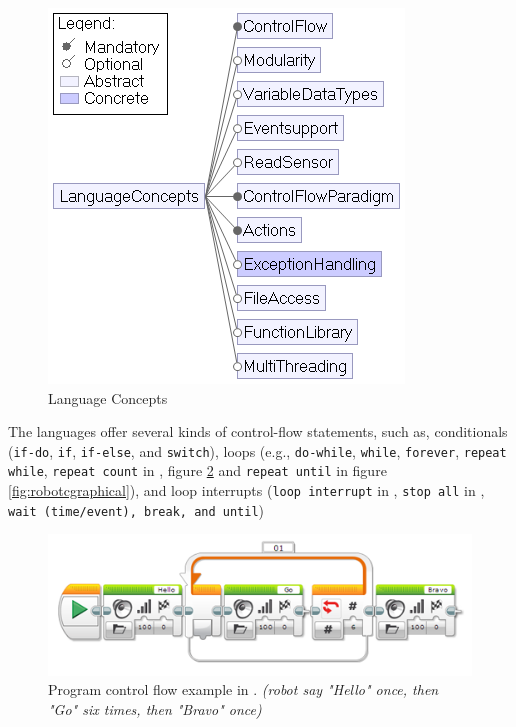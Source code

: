 \begin{figure}[t]
     \centering
    \includegraphics[width=.6\columnwidth]{LanguageConcepts.png}
      \caption{Language Concepts%
      }
      \label{fig:langconcepts}
			\vspace{-.4cm}
   \end{figure}

 The languages offer several kinds of control-flow statements, such as, conditionals (\texttt{if-do}, \texttt{if}, \texttt{if-else}, and \texttt{switch}), loops (e.g., \texttt{do-while}, \texttt{while}, \texttt{forever}, \texttt{repeat while}, \texttt{repeat count} in \lego, figure \ref{fig:controlFlow} and \texttt{repeat until} in figure \ref{fig:robotcgraphical}), and loop interrupts (\texttt{loop interrupt} in \lego, \texttt{stop all} in \tello, \texttt{wait (time/event), break, and until})%
\begin{figure}[t]
     \centering
    \includegraphics[width=1\columnwidth]{legoLoop.png}
      \caption{Program control flow example in \lego. \emph{(robot say "Hello" once, then "Go" six times, then "Bravo" once)}%
      }
      \label{fig:controlFlow}
			\vspace{-.4cm}
   \end{figure}


